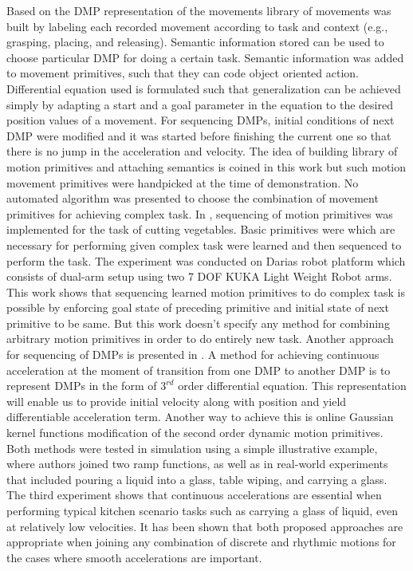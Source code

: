 Based on the DMP representation of the movements library of movements was built by labeling each recorded movement according to task and context (e.g., grasping, placing, and releasing). Semantic information stored can be used to choose particular DMP for doing a certain task. Semantic information was added to movement primitives, such that they can code object oriented action. Differential equation used is formulated such that generalization can be achieved simply by adapting a start and a goal parameter in the equation to the desired position values of a movement. For sequencing DMPs, initial conditions of next DMP were modified and it was started before finishing the current one so that there is no jump in the acceleration and velocity. The idea of building library of motion primitives and attaching semantics is coined in this work but such motion movement primitives were handpicked at the time of demonstration. No automated algorithm was presented to choose the combination of movement primitives for achieving complex task. 
\newline
In \cite{lioutikov2016learning}, sequencing of motion primitives was implemented for the task of cutting vegetables. Basic primitives were which are necessary for performing given complex task were learned and then sequenced to perform the task. The experiment was conducted on Darias robot platform which consists of dual-arm setup using two 7 DOF KUKA Light Weight Robot arms. This work shows that sequencing learned motion primitives to do complex task is possible by enforcing goal state of preceding primitive and initial state of next primitive to be same. But this work doesn't specify any method for combining arbitrary motion primitives in order to do entirely new task. 
\newline
Another approach for sequencing of DMPs is presented in \cite{nemec2012action}. A method for achieving continuous acceleration at the moment of transition from one DMP to another DMP is to represent DMPs in the form of $3^{rd}$ order differential equation. This representation will enable us to provide initial velocity along with position and yield differentiable acceleration term. Another way to achieve this is online Gaussian kernel functions modification of the second order dynamic motion primitives. Both methods were tested in simulation using a simple illustrative example, where authors joined two ramp functions, as well as in real-world experiments that included pouring a liquid into a glass, table wiping, and carrying a glass. The third experiment shows that continuous accelerations are essential when performing typical kitchen scenario tasks such as carrying a glass of liquid, even at relatively low velocities. It has been shown that both proposed approaches are appropriate when joining any combination of discrete and rhythmic motions for the cases where smooth accelerations are important.
